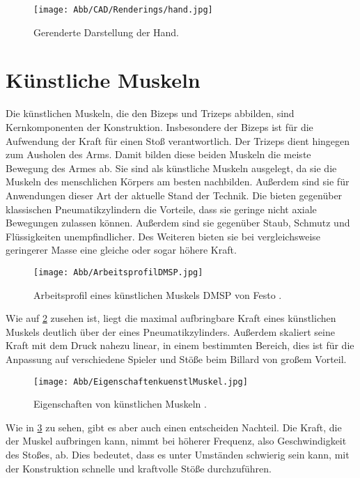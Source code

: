 		\begin{figure}[h]
			\centering
			\texttt{[image: Abb/CAD/Renderings/hand.jpg]}
			\caption[Gerenderte Darstellung der Hand]{Gerenderte Darstellung der Hand.}%
			\label{fig:rendering hand}
		\end{figure}
	
	\section{Künstliche Muskeln}
		Die künstlichen Muskeln, die den Bizeps und Trizeps abbilden, sind Kernkomponenten der Konstruktion.
		Insbesondere der Bizeps ist für die Aufwendung der Kraft für einen Stoß verantwortlich.
		Der Trizeps dient hingegen zum Ausholen des Arms.
		Damit bilden diese beiden Muskeln die meiste Bewegung des Armes ab.
		Sie sind als künstliche Muskeln ausgelegt, da sie die Muskeln des menschlichen Körpers am besten nachbilden.
		Außerdem sind sie für Anwendungen dieser Art der aktuelle Stand der Technik.
		Die bieten gegenüber klassischen Pneumatikzylindern die Vorteile, dass sie geringe nicht axiale Bewegungen zulassen können.
		Außerdem sind sie gegenüber Staub, Schmutz und Flüssigkeiten unempfindlicher.
		Des Weiteren bieten sie bei vergleichsweise geringerer Masse eine gleiche oder sogar höhere Kraft.

		\begin{figure}[h]
			\centering
			\texttt{[image: Abb/ArbeitsprofilDMSP.jpg]}
			\caption{Arbeitsprofil eines künstlichen Muskels DMSP von Festo \cite{DMSP.specs}.}
			\label{fig:ArbeitsprofilDMSP}
		\end{figure}

		Wie auf \cref{fig:ArbeitsprofilDMSP} zusehen ist, liegt die maximal aufbringbare Kraft eines künstlichen Muskels deutlich über der eines Pneumatikzylinders.
		Außerdem skaliert seine Kraft mit dem Druck nahezu linear, in einem bestimmten Bereich, dies ist für die Anpassung auf verschiedene Spieler und Stöße beim Billard von großem Vorteil.

		\begin{figure}[h]
			\centering
			\texttt{[image: Abb/EigenschaftenkuenstlMuskel.jpg]}
			\caption{Eigenschaften von künstlichen Muskeln \cite{DMSP.specs}.}
			\label{fig:EigenschaftenkuenstlMuskel}
		\end{figure}

		Wie in \cref{fig:EigenschaftenkuenstlMuskel} zu sehen, gibt es aber auch einen entscheiden Nachteil. Die Kraft, die der Muskel aufbringen kann, nimmt bei höherer Frequenz, also Geschwindigkeit des Stoßes, ab.
		Dies bedeutet, dass es unter Umständen schwierig sein kann, mit der Konstruktion schnelle und kraftvolle Stöße durchzuführen.

